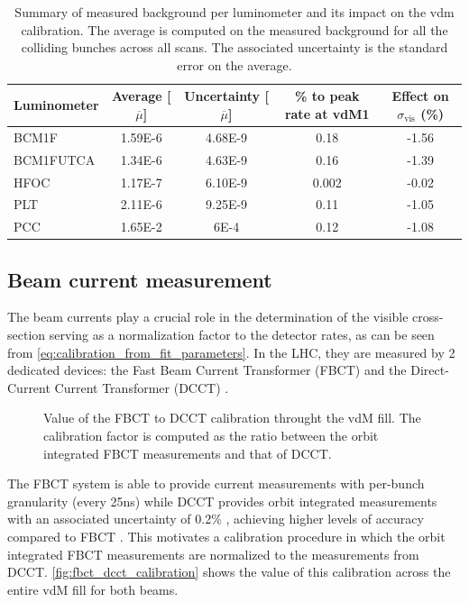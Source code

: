 \begin{table}[!htb]
	\centering
	\caption[Background impact on calibration]{Summary of measured background per luminometer and its impact on the vdm calibration. The average is computed on the measured background for all the colliding bunches across all scans. The associated uncertainty is the standard error on the average.}
	\begin{tabular}{lcccc}
		\hline
		Luminometer & Average [$\overline{\mu}$] & Uncertainty [$\overline{\mu}$] & \% to peak rate at vdM1 & Effect on $\sigma_{\mathrm{vis}}$ (\%) \\
		\hline
		BCM1F & 1.59E-6 & 4.68E-9 & 0.18 & -1.56 \\
		BCM1FUTCA & 1.34E-6 & 4.63E-9 & 0.16 & -1.39 \\
		HFOC & 1.17E-7 & 6.10E-9 & 0.002 & -0.02 \\
		PLT & 2.11E-6 & 9.25E-9 & 0.11 & -1.05 \\
		PCC & 1.65E-2 & 6E-4 & 0.12 & -1.08 \\
		\hline
	\end{tabular}
	\label{tab:ss_summary}
\end{table}

\subsection{Beam current measurement}
\label{subsec:beam_current_measurement}

The beam currents play a crucial role in the determination of the visible cross-section serving as a normalization factor to the detector rates, as can be seen from \autoref{eq:calibration_from_fit_parameters}. In the LHC, they are measured by 2 dedicated devices: the Fast Beam Current Transformer (FBCT) \cite{Belohrad:1267400} and the Direct-Current Current Transformer (DCCT) \cite{Odier:1183400}.

\begin{figure}[!htb]
	\centering
	\caption[FBCT to DCCT calibration]{Value of the FBCT to DCCT calibration throught the vdM fill. The calibration factor is computed as the ratio between the orbit integrated FBCT measurements and that of DCCT.}
	\label{fig:fbct_dcct_calibration}
\end{figure}

The FBCT system is able to provide current measurements with per-bunch granularity (every 25ns) while DCCT provides orbit integrated measurements with an associated uncertainty of 0.2\% \cite{Barschel:2649533}, achieving higher levels of accuracy compared to FBCT \cite{Gras:1379466}. This motivates a calibration procedure in which the orbit integrated FBCT measurements are normalized to the measurements from DCCT. \autoref{fig:fbct_dcct_calibration} shows the value of this calibration across the entire vdM fill for both beams.

